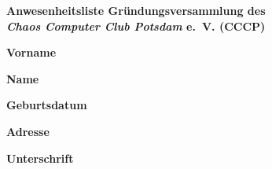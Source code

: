 \documentclass[a4paper, landscape, 10pt, headings=normal]{scrartcl}
\begin{document}
\pagestyle{empty}

\begin{center}
	\linespread{1}
	\huge{\textbf{Anwesenheitsliste Gründungsversammlung des \\ \emph{Chaos Computer Club Potsdam} e.~V. (CCCP)}}
\end{center}

\bigskip

\noindent%
\begin{minipage}[b]{55mm}%
	\textbf{Vorname}%
\end{minipage}%
\hspace{1mm}%
\begin{minipage}[b]{55mm}%
	\textbf{Name}%
\end{minipage}%
\hspace{1mm}%
\begin{minipage}[b]{30mm}%
	\textbf{Geburtsdatum}%
\end{minipage}%
\hspace{1mm}%
\begin{minipage}[b]{60mm}%
	\textbf{Adresse}%
\end{minipage}%
\hspace{1mm}%
\begin{minipage}[b]{43mm}%
	\textbf{Unterschrift}%
\end{minipage}%
\strut%
\end{document}
